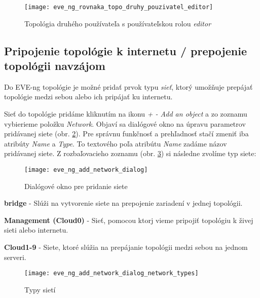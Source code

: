 \begin{figure}
    \centering
    \texttt{[image: eve\_ng\_rovnaka\_topo\_druhy\_pouzivatel\_editor]}
    \caption{Topológia druhého používateľa s používateľskou rolou \emph{editor}}
    \label{obr:eve_ng_rovnaka_topo_druhy_pouzivatel_editor}
\end{figure}





\subsection{Pripojenie topológie k internetu / prepojenie topológii navzájom}

Do EVE-ng topológie je možné pridať prvok typu \emph{sieť}, ktorý umožňuje prepájať topológie medzi sebou alebo ich pripájať ku internetu.

Sieť do topológie pridáme kliknutím na ikonu \emph{+ - Add an object} a zo zoznamu vybierieme položku \emph{Network}. Objaví sa dialógové okno na úpravu parametrov pridávanej siete (obr. \ref{obr:eve_ng_add_network_dialog}). Pre správnu funkčnosť a prehľadnosť stačí zmeniť iba atribúty \emph{Name} a \emph{Type}. To textového poľa atribútu \emph{Name} zadáme názov pridávanej siete. Z rozbaľovacieho zoznamu (obr. \ref{obr:eve_ng_add_network_dialog_network_types}) si následne zvolíme typ siete:

\begin{figure}
    \centering
    \texttt{[image: eve\_ng\_add\_network\_dialog]}
    \caption{Dialógové okno pre pridanie siete}
    \label{obr:eve_ng_add_network_dialog}
\end{figure}

\begin{description}
    \item \textbf{bridge} - Slúži na vytvorenie siete na prepojenie zariadení v jednej topológii.
    \item \textbf{Management (Cloud0)} - Sieť, pomocou ktorj vieme pripojiť topológiu k živej sieti alebo internetu.
    \item \textbf{Cloud1-9} - Siete, ktoré slúžia na prepájanie topológii medzi sebou na jednom serveri.
\end{description}

\begin{figure}
    \centering
    \texttt{[image: eve\_ng\_add\_network\_dialog\_network\_types]}
    \caption{Typy sietí}
    \label{obr:eve_ng_add_network_dialog_network_types}
\end{figure}

